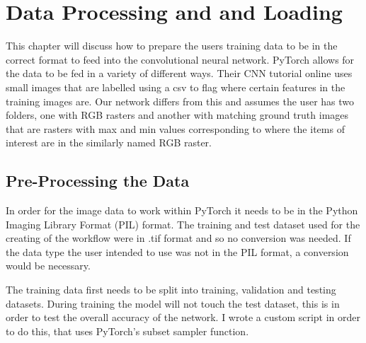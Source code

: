 \chapter{Data Processing and and Loading}
This chapter will discuss how to prepare the users training data to be in the correct format to feed into the convolutional neural network. PyTorch allows for the data to be fed in a variety of different ways. Their CNN tutorial online uses small images that are labelled using a csv to flag where certain features in the training images are. Our network differs from this and assumes the user has two folders, one with RGB rasters and another with matching ground truth images that are rasters with max and min values corresponding to where the items of interest are in the similarly named RGB raster. 

\par


\section{Pre-Processing the Data}
In order for the image data to work within PyTorch it needs to be in the Python Imaging Library Format (PIL) format. The training and test dataset used for the creating of the workflow were in .tif format and so no conversion was needed. If the data type the user intended to use was not in the PIL format, a conversion would be necessary.
\par
The training data first needs to be split into training, validation and testing datasets. During training the model will not touch the test dataset, this is in order to test the overall accuracy of the network. I wrote a custom script in order to do this, that uses PyTorch's subset sampler function.
